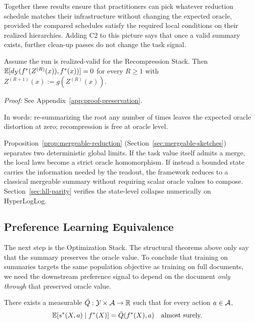 Together these results ensure that practitioners can pick whatever reduction schedule matches their infrastructure without changing the expected oracle, provided the compared schedules satisfy the required local conditions on their realized hierarchies. Adding C2 to this picture says that once a valid summary exists, further clean-up passes do not change the task signal.

\begin{theorem}\label{thm:multi-round}
Assume the run is realized-valid for the Recompression Stack. Then $\mathbb{E}[d_{\mathcal{Y}}(f^\ast(Z^{(R)}(x)), f^\ast(x))] = 0$ for every $R \geq 1$ with $Z^{(R+1)}(x) := g(Z^{(R)}(x))$.
\end{theorem}

\noindent\textit{Proof:} See Appendix~\ref{app:proof-preservation}.

\noindent In words: re-summarizing the root any number of times leaves the expected oracle distortion at zero; recompression is free at oracle level.

Proposition~\ref{prop:mergeable-reduction} (Section~\ref{sec:mergeable-sketches}) separates two deterministic global limits. If the task value itself admits a merge, the local laws become a strict oracle homomorphism. If instead a bounded state carries the information needed by the readout, the framework reduces to a classical mergeable summary without requiring scalar oracle values to compose. Section~\ref{sec:hll-parity} verifies the state-level collapse numerically on HyperLogLog.

\subsection{Preference Learning Equivalence}

The next step is the Optimization Stack. The structural theorems above only say that the summary preserves the oracle value. To conclude that training on summaries targets the same population objective as training on full documents, we need the downstream preference signal to depend on the document \emph{only through} that preserved oracle value.

\begin{assumption}\label{ass:CF}
There exists a measurable $\bar{Q}: \mathcal{Y} \times \mathcal{A} \to \mathbb{R}$ such that for every action $a \in \mathcal{A}$,
\[
\mathbb{E}\!\left[s^\ast(X, a) \mid f^\ast(X)\right] = \bar{Q}(f^\ast(X), a) \quad \text{almost surely.}
\]
\end{assumption}

